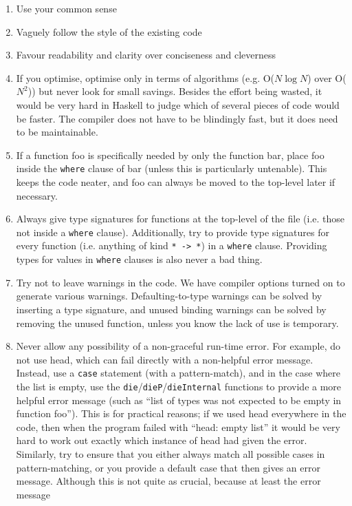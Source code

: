 \documentclass[a4wide]{article}
\begin{document}
\begin{enumerate}
\item Use your common sense
\item Vaguely follow the style of the existing code
\item Favour readability and clarity over conciseness and cleverness
\item If you optimise, optimise only in terms of algorithms (e.g. O($N \log N$) over O($N^2$)) but never look for small savings.
Besides the effort being wasted, it would be very hard in Haskell to judge which of several pieces of
code would be faster.  The compiler does not have to be blindingly fast, but it does need to be
maintainable.
%
\item If a function foo is specifically needed by only the function bar, place foo inside the \lstinline|where|
clause of bar (unless this is particularly untenable).  This keeps the code neater, and foo can always
be moved to the top-level later if necessary.
\item Always give type signatures for functions at the top-level of the file (i.e. those not inside a
\lstinline|where| clause).  Additionally, try to provide type signatures for every function
(i.e. anything of kind \lstinline|* -> *|) in a \lstinline|where| clause.  Providing types for values in
\lstinline|where| clauses is also never a bad thing.
%
\item Try not to leave warnings in the code.  We have compiler options turned on to generate various warnings.
Defaulting-to-type warnings can be solved by inserting a type signature, and unused binding warnings can
be solved by removing the unused function, unless you know the lack of use is temporary.
\item Never allow any possibility of a non-graceful run-time error.  For example, do not use head, which
can fail directly with a non-helpful error message.  Instead, use a \lstinline|case| statement (with a
pattern-match), and in the case where the list is empty, use the \lstinline|die|/\lstinline|dieP|/\lstinline|dieInternal| functions to provide a
more helpful error message (such as ``list of types was not expected to be empty in function foo'').  This is for
practical reasons; if we used head everywhere in the code, then when the program failed with ``head: empty list''
it would be very hard to work out exactly which instance of head had given the error.  Similarly, try to
ensure that you either always match all possible cases in pattern-matching, or you provide a default case that
then gives an error message.  Although this is not quite as crucial, because at least the error message

\end{enumerate}
\end{document}
